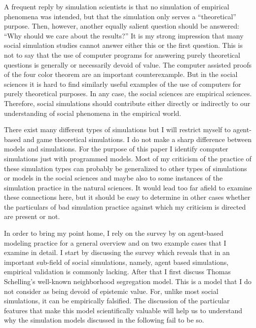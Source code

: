 \documentclass[12pt, english, a4paper]{article}
\begin{document}
A frequent reply by simulation scientists is that no simulation of
empirical phenomena was intended, but that the simulation only serves
a “theoretical” purpose. Then, however, another equally salient
question should be answered: “Why should we care about the results?”
It is my strong impression that many social simulation studies cannot
answer either this or the first question. This is not to say that the
use of computer programs for answering purely theoretical questions is
generally or necessarily devoid of value. The computer assisted proofs
of the four color theorem \citep{wilson:2002} are an important
counterexample. But in the social sciences it is hard to find
similarly useful examples of the use of computers for purely
theoretical purposes. In any case, the social sciences are empirical
sciences. Therefore, social simulations should contribute either
directly or indirectly to our understanding of social phenomena in the
empirical world.

There exist many different types of simulations but I will restrict
myself to agent-based and game theoretical simulations.  I do not make
a sharp difference between models and simulations. For the purpose of
this paper I identify computer simulations just with programmed
models. Most of my criticism of the practice of these simulation types
can probably be generalized to other types of simulations or models in
the social sciences and maybe also to some instances of the simulation
practice in the natural sciences. It would lead too far afield to
examine these connections here, but it should be easy to determine in
other cases whether the particulars of bad simulation practice against
which my criticism is directed are present or not.

In order to bring my point home, I rely on the survey by
\citet{heath-et-al:2009} on agent-based modeling practice for a
general overview and on two example cases that I examine in detail. I
start by discussing the survey which reveals that in an important
sub-field of social simulations, namely, agent based simulations,
empirical validation is commonly lacking. After that I first discuss
Thomas Schelling’s well-known neighborhood segregation model. This is
a model that I do not consider as being devoid of epistemic
value. For, unlike most social simulations, it can be empirically
falsified. The discussion of the particular features that make this
model scientifically valuable will help us to understand why the
simulation models discussed in the following fail to be so.
\end{document}
